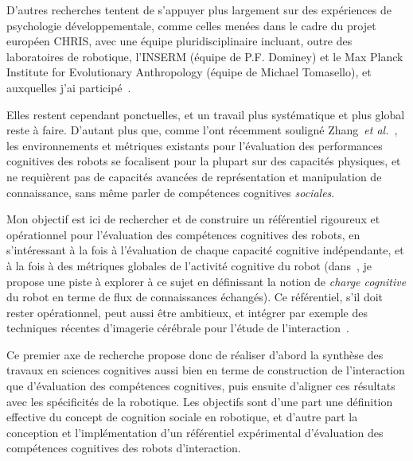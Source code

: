 \documentclass[a4paper]{article}
\newcommand{\etal}{{\textit{et al.~}}}
\begin{document}
D'autres recherches tentent de s'appuyer plus largement sur des expériences de
psychologie développementale, comme celles menées dans le cadre du projet
européen CHRIS, avec une équipe pluridisciplinaire incluant, outre des
laboratoires de robotique, l'INSERM (équipe de P.F. Dominey) et le Max Planck
Institute for Evolutionary Anthropology (équipe de Michael Tomasello), et
auxquelles j'ai participé~\cite{Lallee2010b}.

Elles restent cependant ponctuelles, et un travail plus
systématique et plus global reste à faire. D'autant plus que, comme l'ont
récemment souligné Zhang~\etal\cite{zhang2013evaluation}, les environnements et
métriques existants pour l'évaluation des performances cognitives des robots se
focalisent pour la plupart sur des capacités physiques, et ne requièrent pas de
capacités avancées de représentation et manipulation de connaissance, sans même
parler de compétences cognitives \emph{sociales}.


Mon objectif est ici de rechercher et de construire un référentiel rigoureux et
opérationnel pour l'évaluation des compétences cognitives des robots, en
s'intéressant à la fois à l'évaluation de chaque capacité cognitive
indépendante, et à la fois à des métriques globales de l'activité cognitive du
robot (dans~\cite{lemaignan2013explicit}, je propose une piste à explorer à ce
sujet en définissant la notion de \emph{charge cognitive} du robot en terme de
flux de connaissances échangés). Ce référentiel, s'il doit rester opérationnel,
peut aussi être ambitieux, et intégrer par exemple des techniques récentes
d'imagerie cérébrale pour l'étude de l'interaction~\cite{dumas2010inter}.

Ce premier axe de recherche propose donc de réaliser d'abord la synthèse des
travaux en sciences cognitives aussi bien en terme de construction de
l'interaction que d'évaluation des compétences cognitives, puis ensuite
d'aligner ces résultats avec les spécificités de la robotique. Les objectifs
sont d'une part une définition effective du concept de cognition sociale en
robotique, et d'autre part la conception et l'implémentation d'un référentiel
expérimental d'évaluation des compétences cognitives des robots d'interaction.
\end{document}
